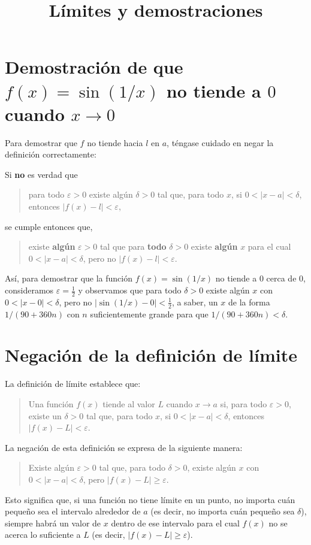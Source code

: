 \documentclass[12pt]{article}
\title{Límites y demostraciones}
\author{}
\date{}
\begin{document}
\maketitle

\section*{Demostración de que $f(x) = \sin(1/x)$ no tiende a $0$ cuando $x \to 0$}

Para demostrar que $f$ no tiende hacia $l$ en $a$, téngase cuidado en negar la definición correctamente:

Si \textbf{no} es verdad que
\begin{quote}
    para todo $\varepsilon > 0$ existe algún $\delta > 0$ tal que, para todo $x$, si $0 < |x - a| < \delta$, entonces $|f(x) - l| < \varepsilon$,
\end{quote}
se cumple entonces que,
\begin{quote}
    existe \textbf{algún} $\varepsilon > 0$ tal que para \textbf{todo} $\delta > 0$ existe \textbf{algún} $x$ para el cual $0 < |x - a| < \delta$, pero no $|f(x) - l| < \varepsilon$.
\end{quote}

Así, para demostrar que la función $f(x) = \sin(1/x)$ no tiende a $0$ cerca de $0$, consideramos $\varepsilon = \frac{1}{2}$ y observamos que para todo $\delta > 0$ existe algún $x$ con $0 < |x - 0| < \delta$, pero no $|\sin(1/x) - 0| < \frac{1}{2}$, a saber, un $x$ de la forma $1/(90 + 360n)$ con $n$ suficientemente grande para que $1/(90 + 360n) < \delta$.

\section*{Negación de la definición de límite}

La definición de límite establece que:

\begin{quote}
    Una función $f(x)$ tiende al valor $L$ cuando $x \to a$ si, para todo $\varepsilon > 0$, existe un $\delta > 0$ tal que, para todo $x$, si $0 < |x - a| < \delta$, entonces $|f(x) - L| < \varepsilon$.
\end{quote}

La negación de esta definición se expresa de la siguiente manera:

\begin{quote}
    Existe algún $\varepsilon > 0$ tal que, para todo $\delta > 0$, existe algún $x$ con $0 < |x - a| < \delta$, pero $|f(x) - L| \geq \varepsilon$.
\end{quote}

Esto significa que, si una función no tiene límite en un punto, no importa cuán pequeño sea el intervalo alrededor de $a$ (es decir, no importa cuán pequeño sea $\delta$), siempre habrá un valor de $x$ dentro de ese intervalo para el cual $f(x)$ no se acerca lo suficiente a $L$ (es decir, $|f(x) - L| \geq \varepsilon$).
\end{document}
